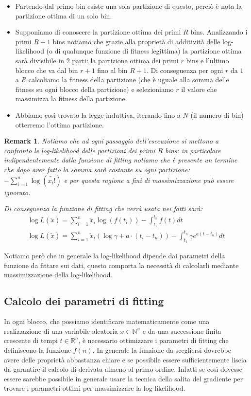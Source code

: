 \documentclass[10pt,a4paper]{report}
\newtheorem{remark}{Remark}
\begin{document}
\begin{itemize}
\item Partendo dal primo bin esiste una sola partizione di questo, perciò è nota la partizione ottima di un solo bin.
\item Supponiamo di conoscere la partizione ottima dei primi $R$ bins. Analizzando i primi $R+1$ bins notiamo che grazie alla proprietà di additività delle log-likelihood (o di qualunque funzione di fitness legittima) la partizione ottima sarà divisibile in $2$ parti: la partizione ottima dei primi $r$ bins e l'ultimo blocco che va dal bin $r+1$ fino al bin $R+1$. Di conseguenza per ogni $r$ da $1$ a $R$ calcoliamo la fitness della partizione (che è uguale alla somma delle fitness su ogni blocco della partizione) e selezioniamo $r$ il valore che massimizza la fitness della partizione.
\item Abbiamo così trovato la legge induttiva, iterando fino a $N$ (il numero di bin) otterremo l'ottima partizione.
\end{itemize}
\begin{remark}
Notiamo che ad ogni passaggio dell'esecuzione si mettono a confronto le log-likelihood delle partizioni dei primi $R$ bins: in particolare indipendentemente dalla funzione di fitting notiamo che è presente un termine che dopo aver fatto la somma sarà costante su ogni partizione: $-\sum_{i=1}^n \log(\tilde{x_i!})$ e per questa ragione a fini di massimizzazione può essere ignorato.

Di conseguenza la funzione di fitting che verrà usata nei fatti sarà:
\begin{gather}
\log L(\tilde{x}) = \sum_{i=1}^n\tilde{x}_i\log(f(t_i)) -\int_{t_1}^{t_n}f(t) dt \\
\log L(\tilde{x}) = \sum_{i=1}^n\tilde{x}_i(\log\gamma + a\cdot(t_i-t_n)) -\int_{t_1}^{t_n}\gamma e^{a(t-t_n)} dt\label{fitness_exp}
\end{gather}
\end{remark}
Notiamo però che in generale la log-likelihood dipende dai parametri della funzione da fittare sui dati, questo comporta la necessità di calcolarli mediante massimizzazione della log-likelihood.
\subsection{Calcolo dei parametri di fitting}
In ogni blocco, che possiamo identificare matematicamente come una realizzazione di una variabile aleatoria $x\in\mathbb{N}^n$ e da una successione finita crescente di tempi $t\in\mathbb{R}^n$, è necessario ottimizzare i parametri di fitting che definiscono la funzione $f(n)$. In generale la funzione da scegliersi dovrebbe avere delle proprietà abbastanza chiare e se possibile essere sufficientemente liscia da garantire il calcolo di derivata almeno al primo ordine. Infatti se così dovesse essere sarebbe possibile in generale usare la tecnica della salita del gradiente per trovare i parametri ottimi per massimizzare la log-likelihood.
\end{document}
